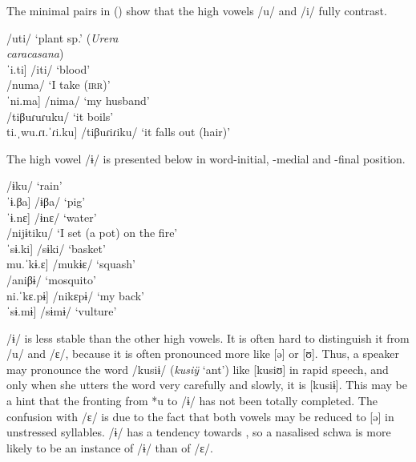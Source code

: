 The minimal pairs in () show that the high vowels /u/ and /i/ fully contrast.

  \ea\label{ex:u-i}
\ea     \tab[ˈu.ti] \tab\tab\tab /uti/ \tab\tab\tab ‘plant sp.’ (\textit{Urera \\ \tab\tab\tab\tab\tab\tab\tab caracasana})\\     %
     \tab{[}ˈi.ti] \tab\tab\tab /iti/ \tab\tab\tab ‘blood’\\
\ex     \tab[ˈnu.ma] \tab\tab /numa/ \tab\tab ‘I take (\textsc{irr})’\\
     \tab{[}ˈni.ma] \tab\tab /nima/ \tab\tab ‘my husband’\\
\ex      {} \tab /tiβuɾuɾuku/ \tab ‘it boils’\\
     \tab{[}ti.ˌwu.ɾɪ.ˈɾi.ku] \tab /tiβuɾiɾiku/ \tab\tab ‘it falls out (hair)’\\%
\z
\xe

The high vowel /ɨ/ is presented below in word-initial, -medial and -final position.

\ea\label{ex:ÿ}
\ea     \tab[ˈɨ.ku] \tab /ɨku/ \tab\tab ‘rain’\\
     \tab{[}ˈɨ.βa] \tab\tab /ɨβa/ \tab\tab ‘pig’\\
     \tab{[}ˈɨ.nɛ] \tab\tab /ɨnɛ/ \tab\tab ‘water’\\
\ex  \tab[nɪ.ˈjɨ.ti.ku] \tab /nijɨtiku/ \tab ‘I set (a pot) on the fire’\\
     \tab{[}ˈsɨ.ki] \tab /sɨki/ \tab\tab ‘basket’\\
     \tab{[}mu.ˈkɨ.ɛ] \tab /mukɨɛ/ \tab ‘squash’\\
\ex  \tab[a.ˈni.βɨ] \tab /aniβɨ/ \tab ‘mosquito’\\
     \tab{[}ni.ˈkɛ.pɨ] \tab /nikɛpɨ/ \tab ‘my back’\\
     \tab{[}ˈsɨ.mɨ] \tab /sɨmɨ/ \tab ‘vulture’\\%
\z
 \xe

/ɨ/ is less stable than the other high vowels. It is often hard to distinguish it from /u/ and /ɛ/, because it is often pronounced more like [ə] or [ʊ]. Thus, a speaker may pronounce the word /kusiɨ/ (\textit{kusiÿ} ‘ant’)  like [kusiʊ] in rapid speech, and only when she utters the word very carefully and slowly, it is [kusiɨ]. This may be a hint that the fronting from *u to /ɨ/ has not been totally completed.
The confusion with /ɛ/ is due to the fact that both vowels may be reduced to [ə] in unstressed syllables. /ɨ/ has a tendency towards , so a nasalised schwa is more likely to be an instance of /ɨ/ than of  /ɛ/. 

